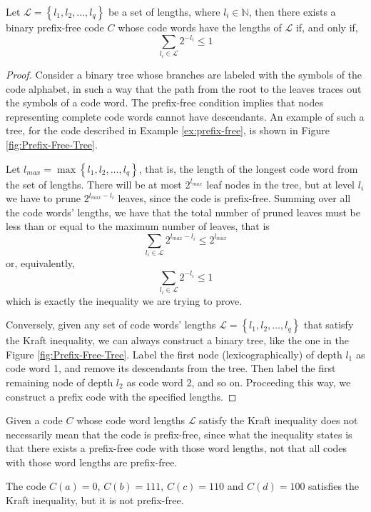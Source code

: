 \begin{theorem}
\label{th:Kraft-Inequality}
Let $\mathcal{L}=\left\{ l_{1},l_{2},\ldots,l_{q}\right\}$ be a set of lengths, where $l_{i}\in\mathbb{N}$, then there exists a binary prefix-free code $C$ whose code words have the lengths of $\mathcal{L}$ if, and only if,
\[
\sum_{l_{i}\in\mathcal{L}}2^{-l_{i}}\leq1
\]
\end{theorem}
\begin{proof}
Consider a binary tree whose branches are labeled with the symbols of the code alphabet, in such a way that the path from the root to the leaves traces out the symbols of a code word. The prefix-free condition implies that nodes representing complete code words cannot have descendants. An example of such a tree, for the code described in Example \ref{ex:prefix-free}, is shown in Figure \ref{fig:Prefix-Free-Tree}.

Let $l_{max}=\max \left\{ l_{1},l_{2},\ldots,l_{q}\right\}$, that is, the length of the longest code word from the set of lengths. There will be at most $2^{l_{max}}$ leaf nodes in the tree, but at level $l_{i}$ we have to prune $2^{l_{max} - l_{i}}$ leaves, since the code is prefix-free. Summing over all the code words' lengths, we have that the total number of pruned leaves must be less than or equal to the maximum number of leaves, that is
\[
\sum_{l_{i}\in\mathcal{L}}2^{l_{max}-l_{i}} \leq 2^{l_{max}}
\]
or, equivalently,
\[
\sum_{l_{i}\in\mathcal{L}}2^{-l_{i}} \leq 1
\]
which is exactly the inequality we are trying to prove.

Conversely, given any set of code words' lengths $\mathcal{L}=\left\{ l_{1},l_{2},\ldots,l_{q}\right\}$ that satisfy the Kraft inequality, we can always construct a binary tree, like the one in the Figure \ref{fig:Prefix-Free-Tree}. Label the first node (lexicographically) of depth $l_{1}$ as code word 1, and remove its descendants from the tree. Then label the first remaining node of depth $l_{2}$ as code word 2, and so on. Proceeding this way, we construct a prefix code with the specified lengths.
\end{proof}

Given a code $C$ whose code word lengths $\mathcal{L}$ satisfy the Kraft inequality does not necessarily mean that the code is prefix-free, since what the inequality states is that there exists a prefix-free code with those word lengths, not that all codes with those word lengths are prefix-free.

\begin{example}
\label{ex:not-prefix-fix}
The code $C(a)=0$, $C(b)=111$, $C(c)=110$ and $C(d)=100$ satisfies the Kraft inequality, but it is not prefix-free.
\end{example}

